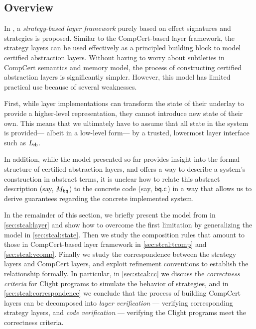 \documentclass[acmsmall,review,anonymous]{acmart}\settopmatter{printfolios=true,printccs=false,printacmref=false}
\begin{document}
\subsection{Overview}

In \citet{rbgs-cal},
a \emph{strategy-based layer framework}
purely based on
effect signatures and strategies is proposed.
Similar to the CompCert-based layer framework,
the strategy layers can be used effectively
as a principled building block
to model certified abstraction layers.
Without having to worry about
subtleties in CompCert semantics and memory model,
the process of constructing certified abstraction layers
is significantly simpler.
However,
this model has limited practical use
because of several weaknesses.

First,
while layer implementations
can transform the state of their underlay
to provide a higher-level representation,
they cannot introduce new state of their own.
This means that we ultimately have to assume that
all state in the system is provided---%
albeit in a low-level form---%
by a trusted, lowermost layer interface
such as $L_{ \mathsf{rb} }$.

In addition,
while the model presented so far
provides insight into the formal structure
of certified abstraction layers,
and offers a way to describe a system's construction
in abstract terms,
it is unclear how to relate
this abstract description (say, $M_{ \mathsf{bq} }$)
to the concrete code (say, $ \mathsf{bq.c} $)
in a way that allows us to derive guarantees
regarding the concrete implemented system.


In the remainder of this section,
we briefly present the model from \citet{rbgs-cal}
in \ref{sec:stcal:layer}
and show how to overcome the first limitation
by generalizing the model
in \ref{sec:stcal:state}.
Then we study the composition rules
that amount to those
in CompCert-based layer framework
in \ref{sec:stcal:tcomp}
and \ref{sec:stcal:vcomp}.
Finally we study the correspondence between
the strategy layers and CompCert layers,
and exploit refinement conventions
to establish the relationship formally.
In particular,
in \ref{sec:stcal:cc}
we discuss the \emph{correctness criteria} for Clight programs
to simulate the behavior of strategies,
and
in \ref{sec:stcal:correspondence}
we conclude that
the process of building CompCert layers
can be decomposed into
\emph{layer verification} ---
verifying corresponding strategy layers,
and \emph{code verification} ---
verifying the Clight programs meet
the correctness criteria.
\end{document}
